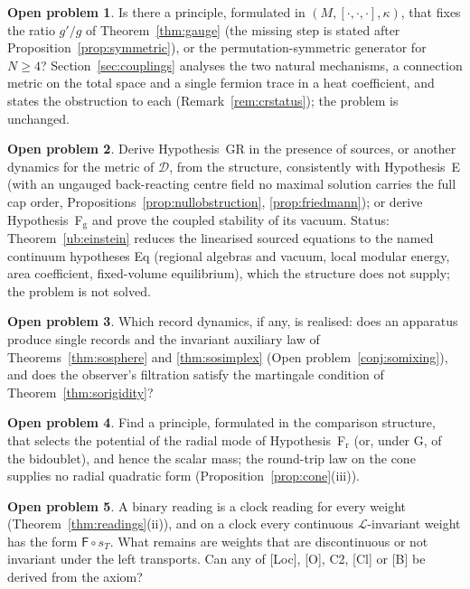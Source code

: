 \documentclass[aps,pra,onecolumn,superscriptaddress,nofootinbib,10pt]{revtex4-2}
\theoremstyle{definition}
\newtheorem{problem}{Open problem}
\theoremstyle{remark}
\newcommand{\cL}{\mathcal{L}}
\newcommand{\cD}{\mathcal{D}}
\newcommand{\hp}[3]{[#1,#2,#3]}
\begin{document}
\begin{problem}
Is there a principle, formulated in $(M,\hp{\cdot}{\cdot}{\cdot},\kappa)$, that fixes the ratio $g'/g$ of
Theorem~\ref{thm:gauge} (the missing step is stated after Proposition~\ref{prop:symmetric}), or the
permutation-symmetric generator for $N\ge4$?  Section~\ref{sec:couplings} analyses the two natural
mechanisms, a connection metric on the total space and a single fermion trace in a heat coefficient, and
states the obstruction to each (Remark~\ref{rem:crstatus}); the problem is unchanged.
\end{problem}
\begin{problem}
Derive Hypothesis~GR in the presence of sources, or another dynamics for the metric of $\cD$, from the
structure, consistently with Hypothesis~E (with an ungauged back-reacting centre field no maximal solution
carries the full cap order, Propositions~\ref{prop:nullobstruction}, \ref{prop:friedmann}); or derive Hypothesis~F$_{\mathrm g}$ and prove the coupled stability of its vacuum.
Status: Theorem~\ref{ub:einstein} reduces the linearised sourced equations to the named continuum hypotheses Eq
(regional algebras and vacuum, local modular energy, area coefficient, fixed-volume equilibrium), which
the structure does not supply; the problem is not solved.
\end{problem}
\begin{problem}
Which record dynamics, if any, is realised: does an apparatus produce single records and the
invariant auxiliary law of Theorems~\ref{thm:sosphere} and \ref{thm:sosimplex} (Open problem~\ref{conj:somixing}), and does the
observer's filtration satisfy the martingale condition of Theorem~\ref{thm:sorigidity}?
\end{problem}
\begin{problem}
Find a principle, formulated in the comparison structure, that selects the potential of the radial
mode of Hypothesis~F$_{\mathrm r}$ (or, under G, of the bidoublet), and hence the scalar mass; the round-trip law on
the cone supplies no radial quadratic form (Proposition~\ref{prop:cone}(iii)).
\end{problem}
\begin{problem}
A binary reading is a clock reading for every weight (Theorem~\ref{thm:readings}(ii)), and on a clock every
continuous $\cL$-invariant weight has the form $\mathsf F\circ s_T$.  What remains are weights that are discontinuous
or not invariant under the left transports.  Can any of [Loc], [O], C2, [Cl] or [B] be derived from the axiom?
\end{problem}
\end{document}
